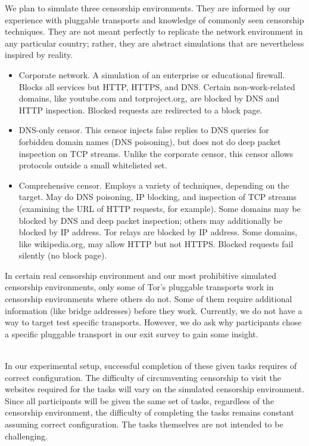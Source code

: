\documentclass{template}
\begin{document}
{\color{red}
We plan to simulate three censorship environments.
They are informed by our experience with pluggable transports
and knowledge of commonly seen censorship techniques.
They are not meant perfectly to replicate the network environment
in any particular country; rather, they are abstract simulations
that are nevertheless inspired by reality.


\begin{itemize} \itemsep1pt \parskip0pt 
\item{Corporate network.}
A simulation of an enterprise or educational firewall.
Blocks all services but HTTP, HTTPS, and DNS.
Certain non-work-related domains, like youtube.com and torproject.org,
are blocked by DNS and HTTP inspection.
Blocked requests are redirected to a block page.
\item{DNS-only censor.}
This censor injects false replies to DNS queries
for forbidden domain names (DNS poisoning),
but does not do deep packet inspection on TCP streams.
Unlike the corporate censor, this censor allows protocols
outside a small whitelisted set.
\item{Comprehensive censor.}
Employs a variety of techniques, depending on the target.
May do DNS poisoning, IP blocking, and inspection of TCP streams
(examining the URL of HTTP requests, for example).
Some domains may be blocked by DNS and deep packet inspection;
others may additionally be blocked by IP address.
Tor relays are blocked by IP address.
Some domains, like wikipedia.org, may allow HTTP but not HTTPS.
Blocked requests fail silently (no block page).
\end{itemize}

In certain real censorship environment and our most 
prohibitive simulated censorship environments, only some of 
Tor's pluggable transports work in censorship environments
where others do not. Some of them require additional information
(like bridge addresses) before they work. Currently, we do not 
have a way to target test specific transports. However, we 
do ask why participants chose a specific pluggable 
transport in our exit survey to gain some insight.}\\

In our experimental setup, successful completion of 
these given tasks requires of correct configuration.
The difficulty of circumventing  censorship to visit the 
websites required for the tasks will vary on the 
simulated censorship environment. Since all participants will be given the 
same set of tasks, regardless of the censorship environment, 
the difficulty of completing the tasks remains constant assuming
correct configuration. The tasks themselves are not intended to
be challenging.
\end{document}

